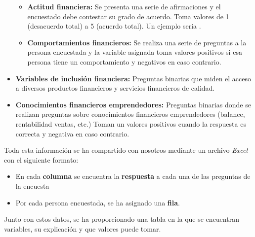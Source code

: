 \begin{itemize}
\begin{itemize}
		\item \textbf{Actitud financiera:} Se presenta una serie de afirmaciones y el encuestado debe contestar su grado de acuerdo. Toma valores de 1 (desacuerdo total) a 5 (acuerdo total). Un ejemplo seria .
		\item \textbf{Comportamientos financieros:} Se realiza una serie de preguntas a la persona encuestada y la variable asignada toma valores positivos si esa persona tiene un comportamiento y negativos en caso contrario.
	\end{itemize}
	\item \textbf{Variables de inclusión financiera:} Preguntas binarias que miden el acceso a diversos productos financieros y servicios financieros de calidad.
	\item \textbf{Conocimientos financieros emprendedores:} Preguntas binarias donde se realizan preguntas sobre conocimientos financieros emprendedores (balance, rentabilidad ventas, etc.) Toman un valores positivos cuando la respuesta es correcta y negativa en caso contrario.
\end{itemize}
Toda esta información se ha compartido con nosotros mediante un archivo \textit{Excel} con el siguiente formato:
\begin{itemize}
	\item En cada \textbf{columna} se encuentra la \textbf{respuesta} a cada una de las preguntas de la encuesta 
	\item Por cada persona encuestada, se ha asignado una \textbf{fila}.
\end{itemize}
Junto con estos datos, se ha proporcionado una tabla en la que se encuentran variables, su explicación y que valores puede tomar.\\
\linebreak
